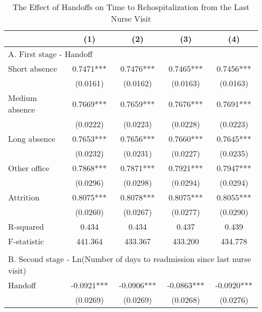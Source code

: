 \documentclass[final,12pt, notitlepage]{article}
\begin{document}
\begin{singlespace}
\begin{table}[H]
\footnotesize
\setlength\tabcolsep{0pt}
\centering
\caption{The Effect of Handoffs on Time to Rehospitalization from the Last Nurse Visit}
\label{tab:days2readmit_iv}
\begin{threeparttable}
{
\def\sym#1{\ifmmode^{#1}\else\(^{#1}\)\fi}
\begin{tabular*}{\textwidth}{l@{\extracolsep{\fill}}*{4}{c}} %
\toprule
                    &\multicolumn{1}{c}{(1)}&\multicolumn{1}{c}{(2)}&\multicolumn{1}{c}{(3)}&\multicolumn{1}{c}{(4)}\\
\midrule
\multicolumn{5}{l}{A. First stage - Handoff} \\
Short absence       &      0.7471***&      0.7476***&      0.7465***&      0.7456***\\
                    &    (0.0161)   &    (0.0162)   &    (0.0163)   &    (0.0163)   \\
Medium absence      &      0.7669***&      0.7659***&      0.7676***&      0.7691***\\
                    &    (0.0222)   &    (0.0223)   &    (0.0228)   &    (0.0223)   \\
Long absence        &      0.7653***&      0.7656***&      0.7660***&      0.7645***\\
                    &    (0.0232)   &    (0.0231)   &    (0.0227)   &    (0.0235)   \\
Other office        &      0.7868***&      0.7871***&      0.7921***&      0.7947***\\
                    &    (0.0296)   &    (0.0298)   &    (0.0294)   &    (0.0294)   \\
Attrition           &      0.8075***&      0.8078***&      0.8075***&      0.8055***\\
                    &    (0.0260)   &    (0.0267)   &    (0.0277)   &    (0.0290)   \\
R-squared           &       0.434   &       0.434   &       0.437   &       0.439   \\
F-statistic         &     441.364   &     433.367   &     433.200   &     434.778   \\
\\
\multicolumn{5}{l}{B. Second stage - Ln(Number of days to readmission since last nurse visit)} \\
Handoff             &     -0.0921***&     -0.0906***&     -0.0863***&     -0.0920***\\
                    &    (0.0269)   &    (0.0269)   &    (0.0268)   &    (0.0276)   \\

\end{tabular*}}
\end{threeparttable}
\end{table}
\end{singlespace}
\end{document}
